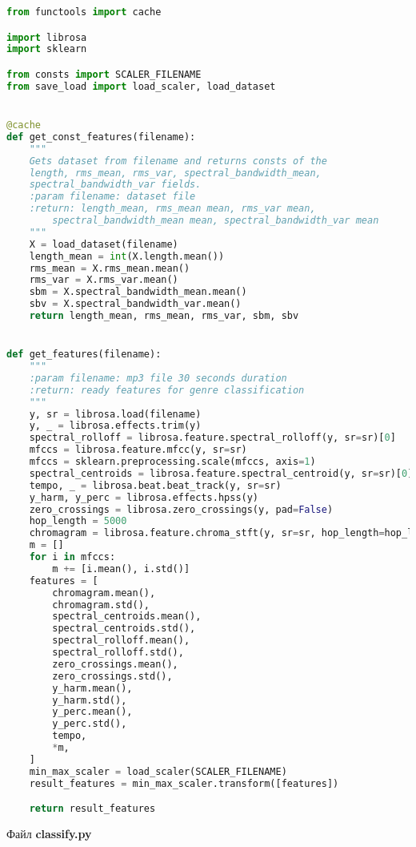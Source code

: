 \begin{lstlisting}[language=Python]
from functools import cache

import librosa
import sklearn

from consts import SCALER_FILENAME
from save_load import load_scaler, load_dataset


@cache
def get_const_features(filename):
    """
    Gets dataset from filename and returns consts of the
    length, rms_mean, rms_var, spectral_bandwidth_mean,
    spectral_bandwidth_var fields.
    :param filename: dataset file
    :return: length_mean, rms_mean mean, rms_var mean,
        spectral_bandwidth_mean mean, spectral_bandwidth_var mean
    """
    X = load_dataset(filename)
    length_mean = int(X.length.mean())
    rms_mean = X.rms_mean.mean()
    rms_var = X.rms_var.mean()
    sbm = X.spectral_bandwidth_mean.mean()
    sbv = X.spectral_bandwidth_var.mean()
    return length_mean, rms_mean, rms_var, sbm, sbv


def get_features(filename):
    """
    :param filename: mp3 file 30 seconds duration
    :return: ready features for genre classification
    """
    y, sr = librosa.load(filename)
    y, _ = librosa.effects.trim(y)
    spectral_rolloff = librosa.feature.spectral_rolloff(y, sr=sr)[0]
    mfccs = librosa.feature.mfcc(y, sr=sr)
    mfccs = sklearn.preprocessing.scale(mfccs, axis=1)
    spectral_centroids = librosa.feature.spectral_centroid(y, sr=sr)[0]
    tempo, _ = librosa.beat.beat_track(y, sr=sr)
    y_harm, y_perc = librosa.effects.hpss(y)
    zero_crossings = librosa.zero_crossings(y, pad=False)
    hop_length = 5000
    chromagram = librosa.feature.chroma_stft(y, sr=sr, hop_length=hop_length)
    m = []
    for i in mfccs:
        m += [i.mean(), i.std()]
    features = [
        chromagram.mean(),
        chromagram.std(),
        spectral_centroids.mean(),
        spectral_centroids.std(),
        spectral_rolloff.mean(),
        spectral_rolloff.std(),
        zero_crossings.mean(),
        zero_crossings.std(),
        y_harm.mean(),
        y_harm.std(),
        y_perc.mean(),
        y_perc.std(),
        tempo,
        *m,
    ]
    min_max_scaler = load_scaler(SCALER_FILENAME)
    result_features = min_max_scaler.transform([features])

    return result_features

\end{lstlisting}

Файл \textbf{classify.py}

